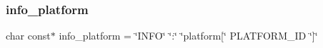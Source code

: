 \subsubsection{\texorpdfstring{info\+\_\+platform}{info\_platform}}
{\footnotesize\ttfamily char const$\ast$ info\+\_\+platform = \char`\"{}I\+N\+FO\char`\"{} \char`\"{}\+:\char`\"{} \char`\"{}platform\mbox{[}\char`\"{} P\+L\+A\+T\+F\+O\+R\+M\+\_\+\+ID \char`\"{}\mbox{]}\char`\"{}}

